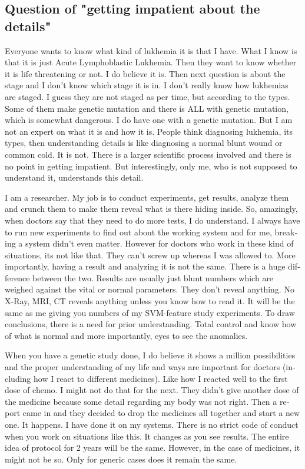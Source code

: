 \begin{english}
\subsection*{Question of "getting impatient about the details"} 

Everyone wants to know what kind of lukhemia it is that I have. What I know is that it is just Acute 
Lymphoblastic Lukhemia. Then they want to know whether it is life threatening or not. I do believe 
it is. Then next question is about the stage and I don't know which stage it is in. I don't really know 
how lukhemias are staged. I guess they are not staged as per time, but according to the types. 
Some of them make genetic mutation and there is ALL with genetic mutation, which is somewhat 
dangerous. I do have one with a genetic mutation. But I am not an expert on what it is and 
how it is. People think diagnosing lukhemia, its types, then understanding details is like 
diagnosing a normal blunt wound or common cold. It is not. There is a larger scientific process 
involved and there is no point in getting impatient. But interestingly, only me, who is not 
supposed to understand it, understands this detail.

I am a researcher. My job is to conduct experiments, get results, analyze them and crunch them 
to make them reveal what is there hiding inside. So, amazingly, when doctors say that they need to do 
more tests, I do understand. I always have to run new experiments to find out about the working system 
and for me, breaking a system didn't even matter. However for doctors who work in these kind of 
situations, its not like that. They can't screw up whereas I was allowed to. More importantly, having 
a result and analyzing it is not the same. There is a huge difference between the two. Results are 
usually just blunt numbers which are weighed against the vital or normal parameters. They 
don't reveal anything. No X-Ray, MRI, CT reveals anything unless you know how to read it. It 
will be the same as me giving you numbers of my SVM-feature study experiments. To draw conclusions, 
there is a need for prior understanding. Total control and know how of what is normal and more 
importantly, eyes to see the anomalies. 

When you have a genetic study done, I do believe it shows a million possibilities and the proper 
understanding of my life and ways are important for doctors (including how I react to different 
medicines). Like how I reacted well to the first dose of chemo. I might not do that for the next. They didn't
give another dose of the medicine because some detail regarding my body was not right. Then a report came in and 
they decided to drop the medicines all together and start a new one. It happens. I have done it on 
my systems. There is no strict code of conduct when you work on situations like this. It changes 
as you see results. The entire idea of protocol for 2 years will be the same. However, in the case of medicines, it might not be so. Only for 
generic cases does it remain the same. 


\end{english}

